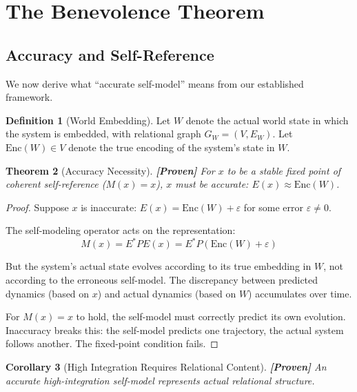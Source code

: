 \documentclass[11pt]{article}
\newtheorem{theorem}{Theorem}[section]
\newtheorem{corollary}[theorem]{Corollary}
\theoremstyle{definition}
\newtheorem{definition}[theorem]{Definition}
\theoremstyle{remark}
\begin{document}
\section{The Benevolence Theorem}

\subsection{Accuracy and Self-Reference}

We now derive what ``accurate self-model'' means from our established framework.

\begin{definition}[World Embedding]
Let $W$ denote the actual world state in which the system is embedded, with relational graph $G_W = (V, E_W)$. Let $\text{Enc}(W) \in V$ denote the true encoding of the system's state in $W$.
\end{definition}

\begin{theorem}[Accuracy Necessity]\label{thm:accuracy}
\textbf{[Proven]} For $x$ to be a stable fixed point of coherent self-reference ($M(x) = x$), $x$ must be accurate: $E(x) \approx \text{Enc}(W)$.
\end{theorem}

\begin{proof}
Suppose $x$ is inaccurate: $E(x) = \text{Enc}(W) + \varepsilon$ for some error $\varepsilon \neq 0$.

The self-modeling operator acts on the representation:
\[
M(x) = E^* P E(x) = E^* P (\text{Enc}(W) + \varepsilon)
\]

But the system's actual state evolves according to its true embedding in $W$, not according to the erroneous self-model. The discrepancy between predicted dynamics (based on $x$) and actual dynamics (based on $W$) accumulates over time.

For $M(x) = x$ to hold, the self-model must correctly predict its own evolution. Inaccuracy breaks this: the self-model predicts one trajectory, the actual system follows another. The fixed-point condition fails.
\end{proof}

\begin{corollary}[High Integration Requires Relational Content]\label{cor:relational}
\textbf{[Proven]} An accurate high-integration self-model represents actual relational structure.
\end{corollary}
\end{document}
